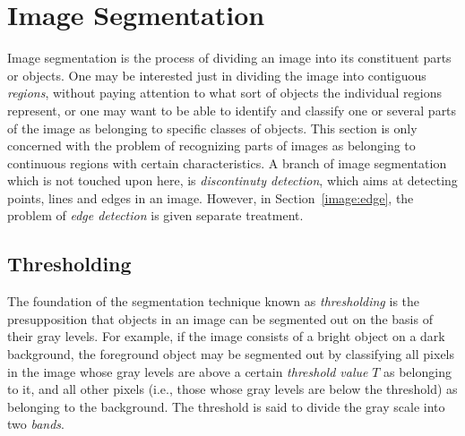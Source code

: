 
\section{Image Segmentation}
\label{image:segment}

Image segmentation is the process of dividing an image into its
constituent parts or objects.  One may be interested just in dividing
the image into contiguous {\em regions\/}, without paying attention to
what sort of objects the individual regions represent, or one may want
to be able to identify and classify one or several parts of the image
as belonging to specific classes of objects.  This section is only
concerned with the problem of recognizing parts of images as belonging
to continuous regions with certain characteristics.  A branch of image
segmentation which is not touched upon here, is {\em discontinuty
  detection\/}, which aims at detecting points, lines and edges in an
image.  However, in Section~\ref{image:edge}, the problem of {\em edge
  detection\/} is given separate treatment.

\subsection{Thresholding}
\label{image:segment:threshold}

The foundation of the segmentation technique known as {\em
  thresholding\/} is the presupposition that objects in an image can
be segmented out on the basis of their gray levels.  For example, if
the image consists of a bright object on a dark background, the
foreground object may be segmented out by classifying all pixels in
the image whose gray levels are above a certain {\em threshold
  value\/} $T$ as belonging to it, and all other pixels (i.e., those
whose gray levels are below the threshold) as belonging to the
background.  The threshold is said to divide the gray scale into two
{\em bands\/}.


